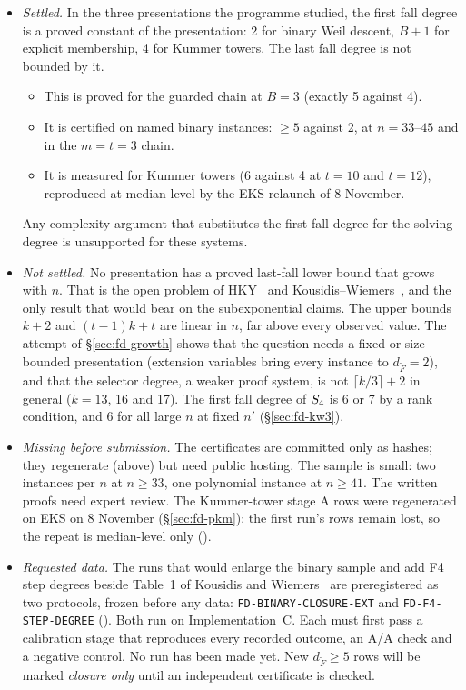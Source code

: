 \begin{itemize}
\item \emph{Settled.} In the three presentations the programme studied,
  the first fall degree is a proved constant of the presentation: 2 for
  binary Weil descent, $B+1$ for explicit membership, 4 for Kummer
  towers. The last fall degree is not bounded by it.
  \begin{itemize}
  \item This is proved for the guarded chain at $B=3$ (exactly 5 against
    4).
  \item It is certified on named binary instances: $\ge5$ against 2, at
    $n=33$--$45$ and in the $m=t=3$ chain.
  \item It is measured for Kummer towers (6 against 4 at $t=10$ and $t=12$),
    reproduced at median level by the EKS relaunch of 8 November.
  \end{itemize}
  Any complexity argument that substitutes the first fall degree for the
  solving degree is unsupported for these systems.
\item \emph{Not settled.} No presentation has a proved last-fall lower
  bound that grows with $n$. That is the open problem of
  HKY~\cite{hky2015} and Kousidis--Wiemers~\cite{kousidis2019}, and the
  only result that would bear on the subexponential claims. The upper
  bounds $k+2$ and $(t-1)k+t$ are linear in $n$, far above every observed
  value.
  The attempt of \S\ref{sec:fd-growth} shows that the question needs a
  fixed or size-bounded presentation (extension variables bring every
  instance to $d_{\tilde F}=2$), and that the selector degree, a weaker
  proof system, is not $\lceil k/3\rceil+2$ in general ($k=13$, 16 and 17). The
  first fall degree of $S_{4}$ is 6 or 7 by a rank condition, and 6 for all
  large $n$ at fixed $n'$ (\S\ref{sec:fd-kw3}).
\item \emph{Missing before submission.} The certificates are committed
  only as hashes; they regenerate (above) but need public hosting. The
  sample is small: two instances per $n$ at $n\ge33$, one polynomial
  instance at $n\ge41$. The written proofs need expert review. The
  Kummer-tower stage A rows were regenerated on EKS on 8 November
  (\S\ref{sec:fd-pkm}); the first run's rows remain lost, so the repeat
  is median-level only
  ().
\item \emph{Requested data.} The runs that would enlarge the binary sample
  and add F4 step degrees beside Table~1 of Kousidis and
  Wiemers~\cite{kousidis2019} are preregistered as two protocols, frozen
  before any data: \texttt{FD-BINARY-CLOSURE-EXT} and
  \texttt{FD-F4-STEP-DEGREE}
  (). Both run on
  Implementation~C. Each must first pass a calibration stage that
  reproduces every recorded outcome, an A/A check and a negative
  control. No run has been made yet. New $d_{\tilde F}\ge5$ rows will be
  marked \emph{closure only} until an independent certificate is
  checked.
\end{itemize}
